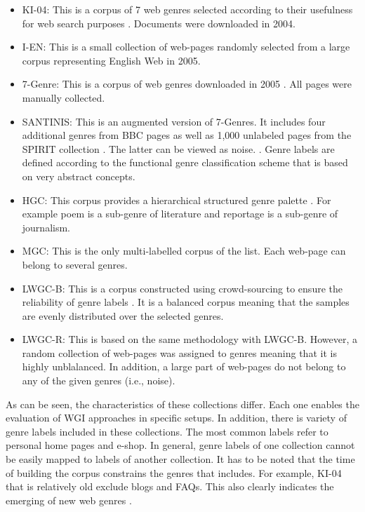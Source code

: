 \begin{itemize}
    \item KI-04: This is a corpus of 7 web genres selected according to their usefulness for web search  purposes . Documents were downloaded in 2004.
    \item I-EN: This is a small collection of web-pages randomly selected from a large corpus representing English Web in 2005.    \item 7-Genre: This is a corpus of web genres downloaded in 2005 . All pages were manually collected. 
    \item SANTINIS: This is an augmented version of 7-Genres. It includes four additional genres from BBC pages as well as 1,000 unlabeled pages from the SPIRIT collection . The latter can be viewed as noise.
    . Genre labels are defined according to the functional genre classification scheme that is based on very abstract concepts.
    \item HGC: This corpus provides a hierarchical structured genre palette  . For example poem is a sub-genre of literature and reportage is a sub-genre of journalism.
    \item MGC: This is the only multi-labelled corpus of the list. Each web-page can belong to several genres. 
    \item LWGC-B: This is a corpus constructed using crowd-sourcing to ensure the reliability of genre labels . It is a balanced corpus meaning that the samples are evenly distributed over the selected genres.
    \item LWGC-R: This is based on the same methodology with LWGC-B. However, a random collection of web-pages was assigned to genres meaning that it is highly unblalanced. In addition, a large part of web-pages do not belong to any of the given genres (i.e., noise).
\end{itemize}

As can be seen, the characteristics of these collections differ. Each one enables the evaluation of WGI approaches in specific setups. In addition, there is variety of genre labels included in these collections. The most common labels refer to personal home pages and e-shop. In general, genre labels of one collection cannot be easily mapped to labels of another collection. It has to be noted that the time of building the corpus constrains the genres that includes. For example, KI-04 that is relatively old exclude blogs and FAQs. This also clearly indicates the emerging of new web genres \parencite{dash2018history}. 

